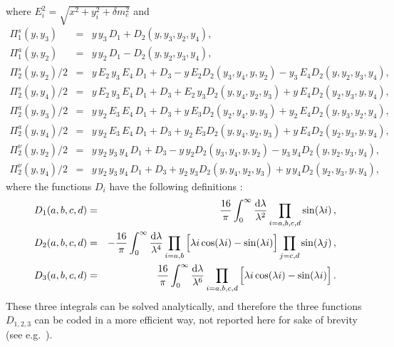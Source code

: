 \documentclass[notitlepage,nofootinbib,showpacs,preprintnumbers,amsmath,amssymb,superscriptaddress,prd,onecolumn]{revtex4-1}
\begin{document}
where $E^2_i = \sqrt{x^2+y_i^2+\delta m_e^2}$ and
\begin{eqnarray}
\Pi_1^s(y,y_3)
&=&
y\,y_3\,D_1+D_2(y,y_3,y_2,y_4),
\\
\Pi_1^a(y,y_2)
&=&
y\,y_2\,D_1-D_2(y,y_2,y_3,y_4),
\\
\Pi_2^s(y,y_2)/2
&=&
y\,E_2\,y_3\,E_4\,D_1 + D_3 - y\,E_2 D_2(y_3,y_4,y,y_2) - y_3\,E_4 D_2(y,y_2,y_3,y_4),
\\
\Pi_2^s(y,y_4)/2
&=&
y\,E_2\,y_3\,E_4\,D_1 + D_3 + E_2\,y_3 D_2(y,y_4,y_2,y_3) + y\,E_4 D_2(y_2,y_3,y,y_4),
\\
\Pi_2^a(y,y_3)/2
&=&
y\,y_2\,E_3\,E_4\,D_1 + D_3 + y\,E_3 D_2(y_2,y_4,y,y_3) + y_2\,E_4 D_2(y,y_3,y_2,y_4),
\\
\Pi_2^a(y,y_4)/2
&=&
y\,y_2\,E_3\,E_4\,D_1 + D_3 + y_2\,E_3 D_2(y,y_4,y_2,y_3) + y\,E_4 D_2(y_2,y_3,y,y_4),
\\
\Pi_2^\nu(y,y_2)/2
&=&
y\,y_2\,y_3\,y_4\,D_1 + D_3 - y\,y_2 D_2(y_3,y_4,y,y_2) - y_3\,y_4 D_2(y,y_2,y_3,y_4),
\\
\Pi_2^\nu(y,y_4)/2
&=&
y\,y_2\,y_3\,y_4\,D_1 + D_3 + y_2\,y_3 D_2(y,y_4,y_2,y_3) + y\,y_4 D_2(y_2,y_3,y,y_4),
\end{eqnarray}
%
where the functions $D_i$ have the following definitions \cite{Dolgov:1997mb}:
%
\begin{eqnarray}
D_1(a,b,c,d)
&=&
\frac{16}{\pi}
\int_0^\infty
\frac{{\rm d}\lambda}{\lambda^2}
\prod_{i=a,b,c,d}\sin(\lambda i)
\,,\\
D_2(a,b,c,d)
&=&
-\frac{16}{\pi}
\int_0^\infty
\frac{{\rm d}\lambda}{\lambda^4}
\prod_{i=a,b}\Big[\lambda i \cos(\lambda i)-\sin(\lambda i)\Big]
\prod_{j=c,d}\sin(\lambda j)
\,,\\
D_3(a,b,c,d)
&=&
\frac{16}{\pi}
\int_0^\infty
\frac{\mathrm{d}\lambda}{\lambda^6}
\prod_{i=a,b,c,d}\Big[\lambda i \cos(\lambda i)-\sin(\lambda i)\Big]
\,.
\end{eqnarray}
These three integrals can be solved analytically,
and therefore the three functions $D_{1, 2, 3}$ can be coded in a more efficient way,
not reported here for sake of brevity
(see e.g.~\cite{Blaschke:2016xxt}).
\end{document}
